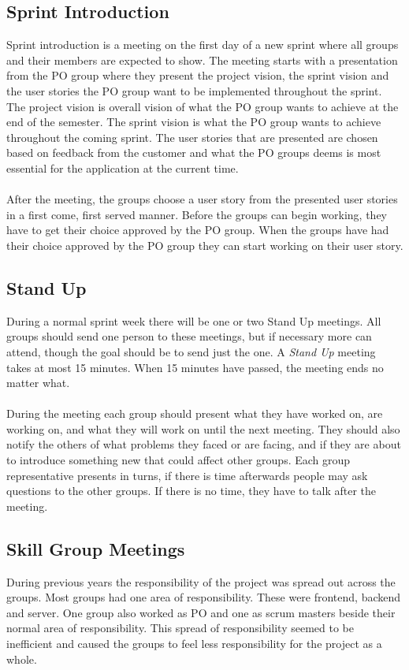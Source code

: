\subsection{Sprint Introduction} \label{subsec:sprint-introduction}
Sprint introduction is a meeting on the first day of a new sprint where all groups and their members are expected to show. 
The meeting starts with a presentation from the PO group where they present the project vision, the sprint vision and the user stories the PO group want to be implemented throughout the sprint.
The project vision is overall vision of what the PO group wants to achieve at the end of the semester.
The sprint vision is what the PO group wants to achieve throughout the coming sprint.
The user stories that are presented are chosen based on feedback from the customer and what the PO groups deems is most essential for the application at the current time.
\\
\\
After the meeting, the groups choose a user story from the presented user stories in a first come, first served manner.
Before the groups can begin working, they have to get their choice approved by the PO group.
When the groups have had their choice approved by the PO group they can start working on their user story.

\subsection{Stand Up}
During a normal sprint week there will be one or two Stand Up meetings.
All groups should send one person to these meetings, but if necessary more can attend, though the goal should be to send just the one.
A \textit{Stand Up} meeting takes at most 15 minutes.
When 15 minutes have passed, the meeting ends no matter what.
\\
\\
During the meeting each group should present what they have worked on, are working on, and what they will work on until the next meeting.
They should also notify the others of what problems they faced or are facing, and if they are about to introduce something new that could affect other groups.
Each group representative presents in turns, if there is time afterwards people may ask questions to the other groups.
If there is no time, they have to talk after the meeting.


\subsection{Skill Group Meetings}
During previous years the responsibility of the project was spread out across the groups.
Most groups had one area of responsibility.
These were frontend, backend and server.
One group also worked as PO and one as scrum masters beside their normal area of responsibility.
This spread of responsibility seemed to be inefficient and caused the groups to feel less responsibility for the project as a whole.
\newline
\newline

